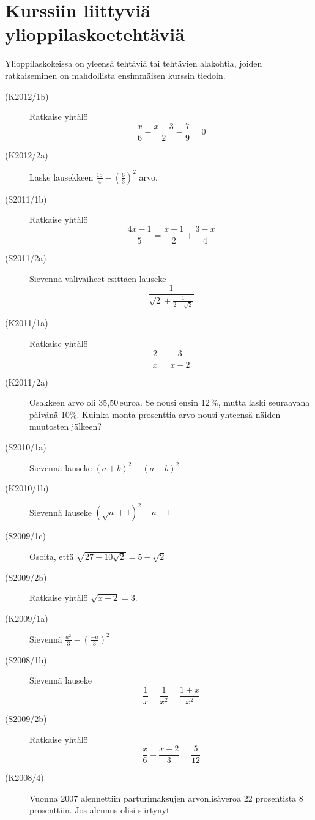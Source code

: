 \chapter{Kurssiin liittyviä ylioppilaskoetehtäviä}

Ylioppilaskokeissa on yleensä tehtäviä tai tehtävien alakohtia, joiden ratkaiseminen on mahdollista ensimmäisen kurssin tiedoin.

\begin{description}

    \item[(K2012/1b)]  Ratkaise yhtälö
                        \[\frac{x}{6} - \frac{x-3}{2} - \frac{7}{9} = 0 \]
    \item[(K2012/2a)]  Laske lausekkeen $ \frac{15}{4} - \left( \frac{6}{3} \right)^2 $ arvo.
    \item[(S2011/1b)]  Ratkaise yhtälö
                        \[ \frac{4x - 1}{5} = \frac{x + 1}{2} + \frac{3 - x}{4} \]
    \item[(S2011/2a)]  Sievennä välivaiheet esittäen lauseke
                        \[ \frac{1}{\sqrt{2} + \frac{1}{2 + \sqrt{2}}} \]
    \item[(K2011/1a)]  Ratkaise yhtälö
                        \[ \frac{2}{x} = \frac{3}{x - 2} \]
    \item[(K2011/2a)]  Osakkeen arvo oli 35,50\,euroa. Se nousi ensin 12\,\%,
                        mutta laski seuraavana päivänä 10\%. Kuinka monta prosenttia
                        arvo nousi yhteensä näiden muutosten jälkeen?
    \item[(S2010/1a)]  Sievennä lauseke $ (a + b)^2 - (a - b)^2 $
    \item[(K2010/1b)]  Sievennä lauseke $ (\sqrt{a} + 1)^2 - a - 1 $
    \item[(S2009/1c)]  Osoita, että $ \sqrt{27 - 10 \sqrt{ 2} } = 5 - \sqrt{2} $
    \item[(S2009/2b)]  Ratkaise yhtälö $ \sqrt{x + 2 } = 3  $.
    \item[(K2009/1a)]  Sievennä $ \frac{a^2}{3} - \left( \frac{-a}{3} \right)^2 $
    \item[(S2008/1b)]  Sievennä lauseke
                        \[ \frac{1}{x} - \frac{1}{x^2} + \frac{1 + x}{x^2} \]
    \item[(S2009/2b)]  Ratkaise yhtälö
                        \[ \frac{x}{6} - \frac{x - 2}{3} = \frac{5}{12} \]
    \item[(K2008/4)]   Vuonna 2007 alennettiin parturimaksujen arvonlisäveroa 22
                        prosentista 8 prosenttiin. Jos alennus olisi siirtynyt

\end{description}
